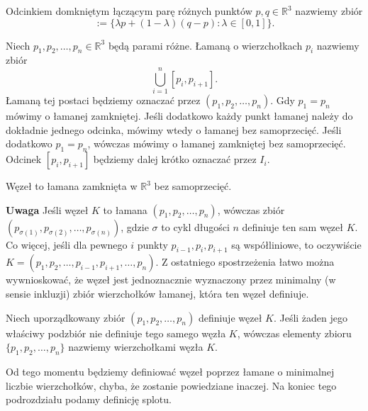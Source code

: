\begin{definicja}
 Odcinkiem domkniętym łączącym parę różnych punktów $p,q\in\mathbb{R}^3$ nazwiemy zbiór 
 \begin{displaymath}
  [p,q] := \lbrace \lambda p + (1-\lambda)(q-p): \lambda\in[0,1]\rbrace.
 \end{displaymath}
\end{definicja}

\begin{definicja}
 Niech $p_1, p_2, \ldots, p_n\in\mathbb{R}^3$ będą parami różne. Łamaną o wierzchołkach $p_i$ nazwiemy zbiór 
 \begin{displaymath}
  \bigcup_{i=1}^n [p_i, p_{i+1}].
 \end{displaymath}
 Łamaną tej postaci będziemy oznaczać przez $(p_1, p_2, \ldots, p_n)$. Gdy $p_1 = p_n$ mówimy o łamanej zamkniętej.
 Jeśli dodatkowo każdy punkt łamanej należy do dokładnie jednego odcinka, mówimy wtedy o łamanej bez samoprzecięć. Jeśli dodatkowo $p_1 = p_n$, wówczas mówimy o łamanej
 zamkniętej bez samoprzecięć. Odcinek $[p_i, p_{i+1}]$ będziemy dalej krótko oznaczać przez $I_i$.
\end{definicja}

\begin{definicja}
 Węzeł to łamana zamknięta w $\mathbb{R}^3$ bez samoprzecięć.
\end{definicja}

\textbf{Uwaga} Jeśli węzeł $K$ to łamana $(p_1, p_2, \ldots, p_n)$, wówczas zbiór $(p_{\sigma(1)}, p_{\sigma(2)},\ldots, p_{\sigma(n)})$, gdzie $\sigma$ to cykl długości $n$
definiuje ten sam węzeł $K$.
Co więcej, jeśli dla pewnego $i$ punkty $p_{i-1}, p_i, p_{i+1}$ są współliniowe, to oczywiście $K = (p_1, p_2, \ldots, p_{i-1}, p_{i+1}, \ldots, p_n)$. Z ostatniego spostrzeżenia łatwo
można wywnioskować, że węzeł jest jednoznacznie wyznaczony przez minimalny (w sensie inkluzji) zbiór wierzchołków łamanej, która ten węzeł definiuje. 

\begin{definicja}
 Niech uporządkowany zbiór $(p_1, p_2,\ldots, p_n)$ definiuje węzeł $K$. Jeśli żaden jego właściwy podzbiór nie definiuje tego samego węzła $K$, wówczas elementy zbioru $\lbrace p_1, p_2, \ldots, p_n\rbrace$
 nazwiemy wierzchołkami węzła $K$.
\end{definicja}

Od tego momentu będziemy definiować węzeł poprzez łamane o minimalnej liczbie wierzchołków, chyba, że zostanie powiedziane inaczej. Na koniec tego podrozdziału podamy definicję splotu.

